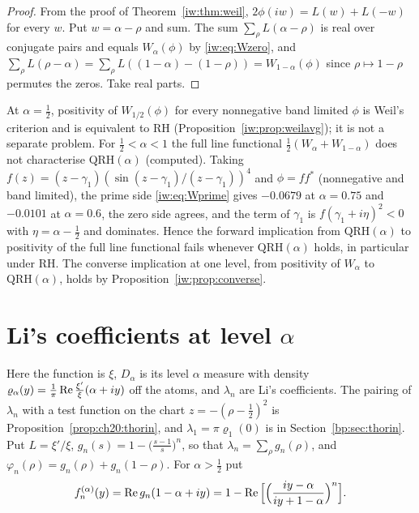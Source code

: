 \begin{proof}
From the proof of Theorem~\ref{iw:thm:weil}, $2\phi(iw)=L(w)+L(-w)$ for every $w$. Put $w=\alpha-\rho$ and sum. The sum $\sum_\rho L(\alpha-\rho)$ is real over conjugate pairs and equals $W_\alpha(\phi)$ by \eqref{iw:eq:Wzero}, and $\sum_\rho L(\rho-\alpha)=\sum_\rho L((1-\alpha)-(1-\rho))=W_{1-\alpha}(\phi)$ since $\rho\mapsto1-\rho$ permutes the zeros. Take real parts.
\end{proof}


\begin{remark}\label{iw:rem:weil}
At $\alpha=\frac12$, positivity of $W_{1/2}(\phi)$ for every nonnegative band limited $\phi$ is Weil's criterion and is equivalent to RH (Proposition~\ref{iw:prop:weilavg}); it is not a separate problem. For $\frac12<\alpha<1$ the full line functional $\frac12(W_\alpha+W_{1-\alpha})$ does not characterise $\mathrm{QRH}(\alpha)$ (computed). Taking $f(z)=(z-\gamma_1)(\sin(z-\gamma_1)/(z-\gamma_1))^4$ and $\phi=ff^*$ (nonnegative and band limited), the prime side \eqref{iw:eq:Wprime} gives $-0.0679$ at $\alpha=0.75$ and $-0.0101$ at $\alpha=0.6$, the zero side agrees, and the term of $\gamma_1$ is $f(\gamma_1+i\eta)^2<0$ with $\eta=\alpha-\frac12$ and dominates. Hence the forward implication from $\mathrm{QRH}(\alpha)$ to positivity of the full line functional fails whenever $\mathrm{QRH}(\alpha)$ holds, in particular under RH. The converse implication at one level, from positivity of $W_\alpha$ to $\mathrm{QRH}(\alpha)$, holds by Proposition~\ref{iw:prop:converse}.
\end{remark}

\section{Li's coefficients at level \texorpdfstring{$\alpha$}{alpha}}\label{iw:sec:li}

Here the function is $\xi$, $D_\alpha$ is its level $\alpha$ measure with density $\varrho_\alpha(y)=\frac1\pi\operatorname{Re}\frac{\xi'}\xi(\alpha+iy)$ off the atoms, and $\lambda_n$ are Li's coefficients. The pairing of $\lambda_n$ with a test function on the chart $z=-(\rho-\frac12)^2$ is Proposition~\ref{prop:ch20:thorin}, and $\lambda_1=\pi\varrho_1(0)$ is in Section~\ref{bp:sec:thorin}. Put $L=\xi'/\xi$, $g_n(s)=1-\big(\frac{s-1}s\big)^n$, so that $\lambda_n=\sum_\rho g_n(\rho)$, and $\varphi_n(\rho)=g_n(\rho)+g_n(1-\rho)$. For $\alpha>\frac12$ put
\[
f_n^{(\alpha)}(y)=\operatorname{Re} g_n(1-\alpha+iy)=1-\operatorname{Re}\Big[\Big(\frac{iy-\alpha}{iy+1-\alpha}\Big)^n\Big].
\]

